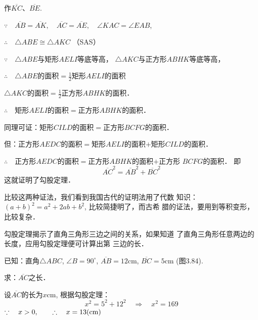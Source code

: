 作$\overline{KC}$、$\overline{BE}$.

$\because\quad \overline{AB}=\overline{AK},\quad \overline{AC}=\overline{AE},\quad \angle KAC=\angle EAB$,

$\therefore\quad \triangle ABE\cong \triangle AKC$ （SAS）

$\because\quad \triangle ABE$与矩形$AELI$等底等高，
$\triangle AKC$与正方形$ABHK$等底等高，

$\therefore\quad \triangle ABE$的面积$=\frac{1}{2}$矩形$AELI$的面积

$\triangle AKC$的面积$=\frac{1}{2}$正方形$ABHK$的面积．

$\therefore\quad $矩形$AELI$的面积$=$正方形$ABHK$的面积．

同理可证：矩形$CILD$的面积$=$正方形$BCFG$的面积．

但：正方形$AEDC$的面积$=$矩形$AELI$的面积$+$矩形$CILD$的面积．

$\therefore\quad $正方形$AEDC$的面积$=$正方形$ABHK$的面积$+$正方形
$BCFG$的面积．
即
\[\overline{AC}^2=\overline{AB}^2+\overline{BC}^2\]
这就证明了勾股定理．

比较这两种证法，我们看到我国古代的证明法用了代数
知识：$(a+b)^2=a^2+2ab+b^2$, 比较简捷明了，而古希
腊的证法，要用到等积变形，比较复杂．

勾股定理揭示了直角三角形三边之间的关系，如果知道
了直角三角形任意两边的长度，应用勾股定理便可计算出第
三边的长．

\begin{example}
    已知：直角$\triangle ABC$, $\angle B=90^{\circ}$, $\overline{AB}=12$cm,
$\overline{BC}=5$cm (图3.84).

求：$\overline{AC}$之长．
\end{example}


\begin{solution}
    设$\overline{AC}$的长为$x$cm, 根据勾股定理：
\[x^2=5^2+12^2\quad \Rightarrow\quad x^2=169\]
$\because\quad x>0,\qquad \therefore\quad x=13({\rm cm})$
\end{solution}

\begin{figure}[htp]\centering
    \begin{minipage}[t]{0.48\textwidth}
    \centering
{}
    \caption{}
    \end{minipage}
    \begin{minipage}[t]{0.48\textwidth}
    \centering
    \caption{}
    \end{minipage}
    \end{figure}

